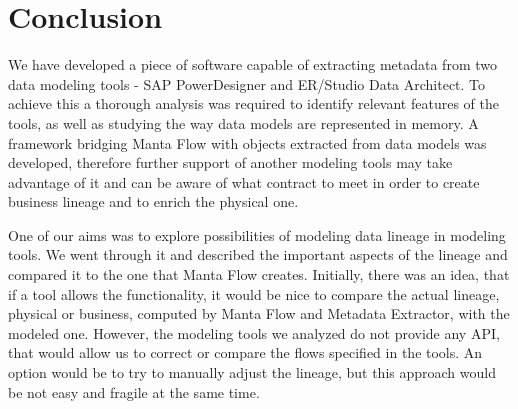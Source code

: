 \chapter*{Conclusion}
We have developed a piece of software capable of extracting metadata from two data modeling tools - SAP PowerDesigner and ER/Studio Data Architect. To achieve this a thorough analysis was required to identify relevant features of the tools, as well as studying the way data models are represented in memory. 
A framework bridging Manta Flow with objects extracted from data models was developed, therefore further support of another modeling tools may take advantage of it and can be aware of what contract to meet in order to create business lineage and to enrich the physical one.

One of our aims was to explore possibilities of modeling data lineage in modeling tools.
We went through it and described the important aspects of the lineage and compared it to the one that Manta Flow creates. 
Initially, there was an idea, that if a tool allows the functionality, it would be nice to compare the actual lineage, physical or business, computed by Manta Flow and Metadata Extractor, with the modeled one. 
However, the modeling tools we analyzed do not provide any API, that would allow us to correct or compare the flows specified in the tools. 
An option would be to try to manually adjust the lineage, but this approach would be not easy and fragile at the same time.

